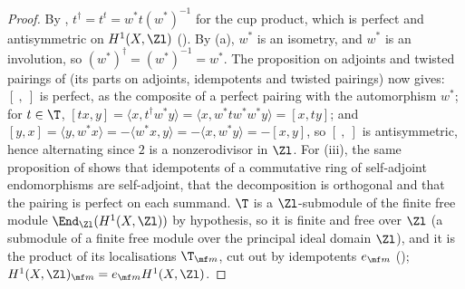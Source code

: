 \begin{proof}
By , $t^\dagger=t^t=w^*t(w^*)^{-1}$ for the cup product, which is perfect and antisymmetric on $H^1(X,\Zl)$ (). By
(a), $w^*$ is an isometry, and $w^*$ is an involution, so $(w^*)^\dagger=(w^*)^{-1}=w^*$. The proposition on adjoints and twisted pairings of
 (its parts on adjoints, idempotents and twisted pairings) now gives: $[\ ,\ ]$ is perfect, as the composite of a perfect pairing with the automorphism $w^*$; for
$t\in\T$, $[tx,y]=\langle x,t^\dagger w^*y\rangle=\langle x,w^*tw^*w^*y\rangle=[x,ty]$; and $[y,x]=\langle y,w^*x\rangle=-\langle w^*x,y\rangle=-\langle x,w^*y\rangle=-[x,y]$, so $[\ ,\ ]$ is antisymmetric, hence alternating
since $2$ is a nonzerodivisor in $\Zl$. For (iii), the same proposition of  shows that idempotents of a commutative ring of self-adjoint endomorphisms are self-adjoint, that the
decomposition is orthogonal and that the pairing is perfect on each summand. $\T$ is a $\Zl$-submodule of the finite free module $\End_{\Zl}(H^1(X,\Zl))$ by hypothesis, so it is finite and free over $\Zl$ (a submodule of a finite free module over the principal ideal domain $\Zl$), and
it is the product of its localisations $\T_{\mf m}$, cut out by idempotents $e_{\mf m}$ (); $H^1(X,\Zl)_{\mf m}=e_{\mf m}H^1(X,\Zl)$.
\end{proof}

